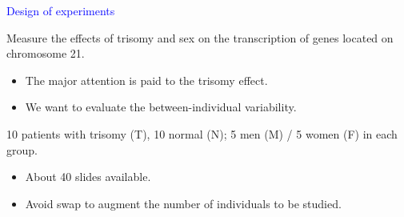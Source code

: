 \documentclass[dvips, lscape]{foils}
\newcommand{\textblue}[1]{\textcolor{blue}{#1}}
\newcommand{\chapter}[1]{
  \addtocounter{chapter}{1}
  \setcounter{section}{0}
  \setcounter{subsection}{0}
  {\centerline{\textblue{\LARGE #1}}}
  }
\newcommand{\paragraph}[1]{\noindent{\textblue{#1}}}
\begin{document}


\newpage
\chapter{Design of experiments}

\bigskip
\paragraph{Biological problem.} Measure the effects of trisomy and sex on the
transcription of genes located on chromosome 21. 
\begin{itemize}
\item The major attention is paid to the trisomy effect.
\item We want to evaluate the between-individual variability.
\end{itemize}

\paragraph{Patients.} 10 patients with trisomy (T), 10 normal (N); 5 men
(M) / 5 women (F) in each group.

\paragraph{Constraints.}
\begin{itemize}
\item About 40 slides available.
\item Avoid swap to augment the number of individuals to be studied.
\end{itemize}
\end{document}
